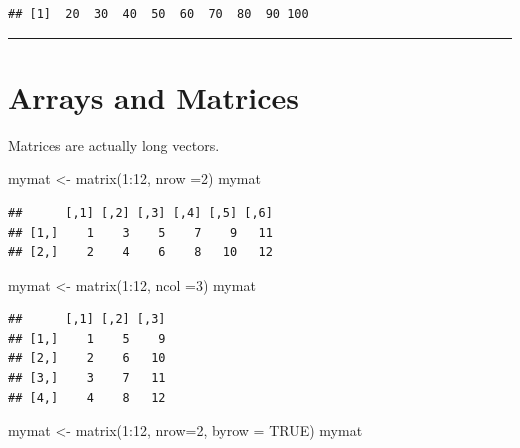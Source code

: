 \documentclass[
]{book}
\newenvironment{Shaded}{\begin{snugshade}}{\end{snugshade}}
\newcommand{\AttributeTok}[1]{\textcolor[rgb]{0.77,0.63,0.00}{#1}}
\newcommand{\ConstantTok}[1]{\textcolor[rgb]{0.00,0.00,0.00}{#1}}
\newcommand{\DecValTok}[1]{\textcolor[rgb]{0.00,0.00,0.81}{#1}}
\newcommand{\FunctionTok}[1]{\textcolor[rgb]{0.00,0.00,0.00}{#1}}
\newcommand{\NormalTok}[1]{#1}
\newcommand{\OtherTok}[1]{\textcolor[rgb]{0.56,0.35,0.01}{#1}}
\newcommand{\SpecialCharTok}[1]{\textcolor[rgb]{0.00,0.00,0.00}{#1}}
\begin{document}
\begin{verbatim}
## [1]  20  30  40  50  60  70  80  90 100
\end{verbatim}

\begin{center}\rule{0.5\linewidth}{0.5pt}\end{center}

\hypertarget{arrays-and-matrices}{%
\section{Arrays and Matrices}\label{arrays-and-matrices}}

Matrices are actually long vectors.

\begin{Shaded}
\begin{Highlighting}[]
\NormalTok{mymat }\OtherTok{\textless{}{-}} \FunctionTok{matrix}\NormalTok{(}\DecValTok{1}\SpecialCharTok{:}\DecValTok{12}\NormalTok{, }\AttributeTok{nrow =}\DecValTok{2}\NormalTok{)}
\NormalTok{mymat}
\end{Highlighting}
\end{Shaded}

\begin{verbatim}
##      [,1] [,2] [,3] [,4] [,5] [,6]
## [1,]    1    3    5    7    9   11
## [2,]    2    4    6    8   10   12
\end{verbatim}

\begin{Shaded}
\begin{Highlighting}[]
\NormalTok{mymat }\OtherTok{\textless{}{-}} \FunctionTok{matrix}\NormalTok{(}\DecValTok{1}\SpecialCharTok{:}\DecValTok{12}\NormalTok{, }\AttributeTok{ncol =}\DecValTok{3}\NormalTok{)}
\NormalTok{mymat}
\end{Highlighting}
\end{Shaded}

\begin{verbatim}
##      [,1] [,2] [,3]
## [1,]    1    5    9
## [2,]    2    6   10
## [3,]    3    7   11
## [4,]    4    8   12
\end{verbatim}

\begin{Shaded}
\begin{Highlighting}[]
\NormalTok{mymat }\OtherTok{\textless{}{-}} \FunctionTok{matrix}\NormalTok{(}\DecValTok{1}\SpecialCharTok{:}\DecValTok{12}\NormalTok{, }\AttributeTok{nrow=}\DecValTok{2}\NormalTok{, }\AttributeTok{byrow =} \ConstantTok{TRUE}\NormalTok{)}
\NormalTok{mymat}
\end{Highlighting}
\end{Shaded}
\end{document}
